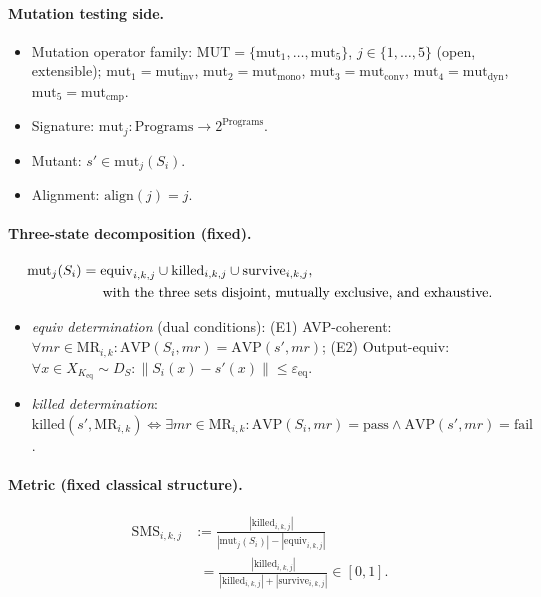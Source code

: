 \documentclass[manuscript,screen,review]{acmart}
\begin{document}
\paragraph{Mutation testing side.}
\begin{itemize}
\item Mutation operator family: $\mathrm{MUT} = \{\mathrm{mut}_1, \ldots, \mathrm{mut}_5\}$, $j \in \{1,\ldots,5\}$ (open, extensible); $\mathrm{mut}_1 = \mathrm{mut}_{\mathrm{inv}}$, $\mathrm{mut}_2 = \mathrm{mut}_{\mathrm{mono}}$, $\mathrm{mut}_3 = \mathrm{mut}_{\mathrm{conv}}$, $\mathrm{mut}_4 = \mathrm{mut}_{\mathrm{dyn}}$, $\mathrm{mut}_5 = \mathrm{mut}_{\mathrm{cmp}}$.
\item Signature: $\mathrm{mut}_j : \text{Programs} \to 2^{\text{Programs}}$.
\item Mutant: $s' \in \mathrm{mut}_j(S_i)$.
\item Alignment: $\mathrm{align}(j) = j$.
\end{itemize}

\paragraph{Three-state decomposition (fixed).}
\[
\begin{aligned}
\mathrm{mut}_j(S_i)
  &= \mathrm{equiv}_{i,k,j} \cup \mathrm{killed}_{i,k,j}
     \cup \mathrm{survive}_{i,k,j},\\
&\hspace{1.5em}\text{with the three sets disjoint, mutually exclusive, and exhaustive.}
\end{aligned}
\]
\begin{itemize}
\item \emph{equiv determination} (dual conditions):
  (E1) AVP-coherent: $\forall \mathit{mr} \in \mathrm{MR}_{i,k}: \mathrm{AVP}(S_i, \mathit{mr}) = \mathrm{AVP}(s', \mathit{mr})$;
  (E2) Output-equiv: $\forall x \in X_{K_{\mathrm{eq}}} \sim D_S: \|S_i(x) - s'(x)\| \leq \varepsilon_{\mathrm{eq}}$.
\item \emph{killed determination}: $\mathrm{killed}(s', \mathrm{MR}_{i,k}) \Leftrightarrow \exists \mathit{mr} \in \mathrm{MR}_{i,k}: \mathrm{AVP}(S_i, \mathit{mr}) = \text{pass} \wedge \mathrm{AVP}(s', \mathit{mr}) = \text{fail}$.
\end{itemize}

\paragraph{Metric (fixed classical structure).}
\begin{align*}
\mathrm{SMS}_{i,k,j} &:= \frac{|\mathrm{killed}_{i,k,j}|}{|\mathrm{mut}_j(S_i)| - |\mathrm{equiv}_{i,k,j}|} \\
                    &\phantom{:}= \frac{|\mathrm{killed}_{i,k,j}|}{|\mathrm{killed}_{i,k,j}| + |\mathrm{survive}_{i,k,j}|} \in [0, 1].
\end{align*}
\end{document}
